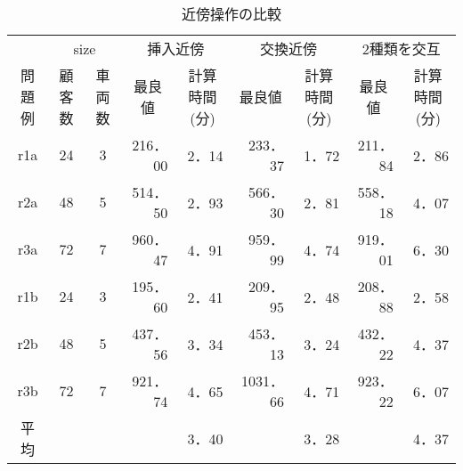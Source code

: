 \documentclass[a4j，11pt，twocolumn]{jsarticle}
\begin{document}
\begin{table*}
 \centering
  \tabcolsep =8pt
  \renewcommand{\arraystretch}{0．8}
  \caption{近傍操作の比較}
  \label{insert}
\begin{tabular}{cccrrrrrr}
\hline
\multicolumn{1}{l}{} & \multicolumn{2}{c}{size} & \multicolumn{2}{c}{挿入近傍}                              & \multicolumn{2}{c}{交換近傍}                              & \multicolumn{2}{c}{2種類を交互}                            \\ \cline{2-9}
問題例                  & 顧客数         & 車両数        & \multicolumn{1}{c}{最良値} & \multicolumn{1}{c}{計算時間(分)} & \multicolumn{1}{c}{最良値} & \multicolumn{1}{c}{計算時間(分)} & \multicolumn{1}{c}{最良値} & \multicolumn{1}{c}{計算時間(分)} \\ \cline{2-9}
r1a                  & 24          & 3          & 216．00                  & 2．14                        & 233．37                  & 1．72                        & 211．84                  & 2．86                        \\
r2a                  & 48          & 5          & 514．50                  & 2．93                        & 566．30                  & 2．81                        & 558．18                  & 4．07                        \\
r3a                  & 72          & 7          & 960．47                  & 4．91                        & 959．99                  & 4．74                        & 919．01                  & 6．30                        \\
r1b                  & 24          & 3          & 195．60                  & 2．41                        & 209．95                  & 2．48                        & 208．88                  & 2．58                        \\
r2b                  & 48          & 5          & 437．56                  & 3．34                        & 453．13                  & 3．24                        & 432．22                & 4．37                        \\
r3b                  & 72          & 7          & 921．74                  & 4．65                        & 1031．66                 & 4．71                        & 923．22                & 6．07                        \\ \hline
平均                   & \multicolumn{1}{l}{} & \multicolumn{1}{l}{} & \multicolumn{1}{l}{}    & 3．40                        &                         & 3．28                        &                         & 4．37                        \\ \hline
\end{tabular}
\end{table*}
\end{document}
